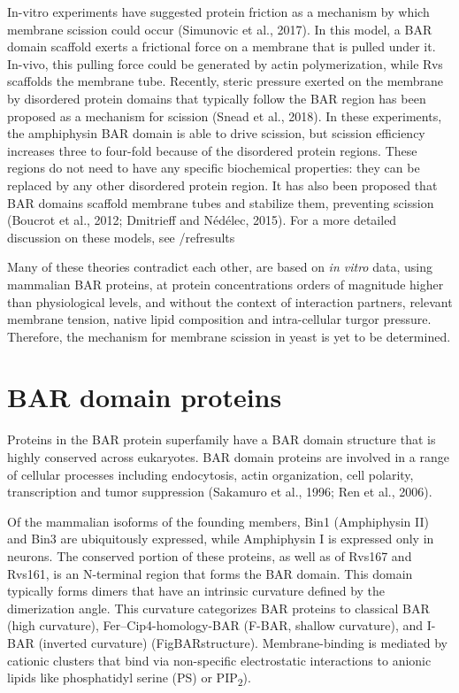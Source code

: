 
			\vspace{5mm}
In-vitro experiments have suggested protein friction as a mechanism by which membrane scission could occur (Simunovic et al., 2017). In this model, a BAR domain scaffold exerts a frictional force on a membrane that is pulled under it. In-vivo, this pulling force could be generated by actin polymerization, while Rvs scaffolds the membrane tube. 
Recently, steric pressure exerted on the membrane by disordered protein domains that typically follow the BAR region has been proposed as a mechanism for scission (Snead et al., 2018). In these experiments, the amphiphysin BAR domain is able to drive scission, but scission efficiency increases three to four-fold because of the disordered protein regions. These regions do not need to have any specific biochemical properties: they can be replaced by any other disordered protein region. It has also been proposed that BAR domains scaffold membrane tubes and stabilize them, preventing scission (Boucrot et al., 2012; Dmitrieff and Nédélec, 2015). For a more detailed discussion on these models, see /ref{results}

			\vspace{5mm}
Many of these theories contradict each other, are based on \textit{in vitro} data, using mammalian BAR proteins, at protein concentrations orders of magnitude higher than physiological levels, and without the context of interaction partners, relevant membrane tension, native lipid composition and intra-cellular turgor pressure. Therefore, the mechanism for membrane scission in yeast is yet to be determined. 

 





		
\section{BAR domain proteins}
	
Proteins in the BAR protein superfamily have a BAR domain structure that is highly conserved across eukaryotes. BAR domain proteins are involved in a range of cellular processes including endocytosis, actin organization, cell polarity, transcription and tumor suppression (Sakamuro et al., 1996; Ren et al., 2006). 

Of the mammalian isoforms of the founding members, Bin1 (Amphiphysin II) and Bin3 are ubiquitously expressed, while Amphiphysin I is expressed only in neurons. The conserved portion of these proteins, as well as of Rvs167 and Rvs161, is an N-terminal region that forms the BAR domain. This domain typically forms dimers that have an intrinsic curvature defined by the dimerization angle. This curvature categorizes BAR proteins to classical BAR (high curvature), Fer–Cip4-homology-BAR (F-BAR, shallow curvature), and I-BAR (inverted curvature) (FigBARstructure). Membrane-binding is mediated by cationic clusters that bind via non-specific electrostatic interactions to anionic lipids like phosphatidyl serine (PS) or PIP\textsubscript{2}).

